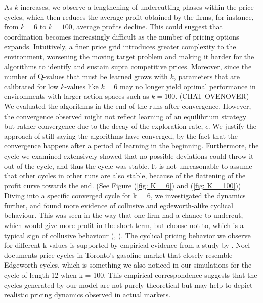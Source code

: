 \documentclass{article}
\begin{document}
As \( k \) increases, we observe a lengthening of undercutting phases within the price cycles, which then reduces the average profit obtained by the firms, for instance, from \( k = 6 \) to \( k = 100 \), average profits decline. This could suggest that coordination becomes increasingly difficult as the number of pricing options expands. Intuitively, a finer price grid introduces greater complexity to the environment, worsening the moving target problem and making it harder for the algorithms to identify and sustain supra competitive prices. Moreover, since the number of Q-values that must be learned grows with \( k \), parameters that are calibrated for low \( k \)-values like \( k = 6 \) may no longer yield optimal performance in environments with larger action spaces such as $ k = 100$.
(CHAT OVENOVER)
\newline
We evaluated the algorithms in the end of the runs after convergence. However, the convergence observed might not reflect learning of an equilibrium strategy but rather
convergence due to the decay of the exploration rate, $\epsilon$. We justify the approach of still saying the algorithms have converged, by the fact that the convergence happens after a period of learning in the beginning. Furthermore, the cycle we examined extensively showed that no possible deviations could throw it out of the cycle, and thus the cycle was stable. It is not unreasonable to assume that other cycles in other runs are also stable, because of the flattening of the profit curve towards the end. (See Figure (\ref{fig: K = 6}) and (\ref{fig: K = 100})) 
\newline
Diving into a specific converged cycle for k = 6, we investigated the dynamics further, and found more evidence of collusive and egdeworth-alike cyclical behaviour. This was seen in the way that one firm had a chance to undercut, which would give more profit in the short term, but choose not to, which is a typical sign of collusive behaviour (\cite{Klein2021}, \cite{Calvano}).
\newline The cyclical pricing behavior we observe for different k-values is supported by empirical evidence from a study by \cite{Noel2007}. Noel documents price cycles in Toronto’s gasoline market that closely resemble Edgeworth cycles, which is something we also noticed in our simulations for the cycle of length 12 when k = 100. This empirical correspondence suggests that the cycles generated by our model are not purely theoretical but may help to depict realistic pricing dynamics observed in actual markets.
\newline
\end{document}
